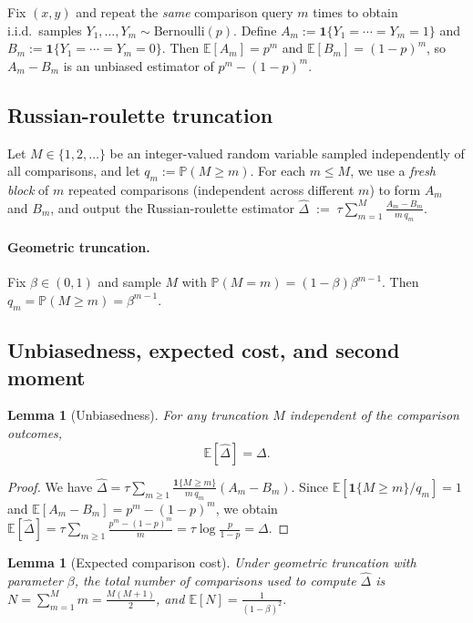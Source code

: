 \documentclass[11pt]{article}
\theoremstyle{plain}
\newtheorem{lemma}[theorem]{Lemma}
\theoremstyle{remark}
\newcommand{\E}{\mathbb{E}}
\newcommand{\Prob}{\mathbb{P}}
\newcommand{\1}{\mathbf{1}}
\begin{document}
Fix $(x,y)$ and repeat the \emph{same} comparison query $m$ times to obtain i.i.d.\ samples
$Y_1,\dots,Y_m\sim\mathrm{Bernoulli}(p)$. Define
$
A_m:=\1\{Y_1=\cdots=Y_m=1\}$
and
$B_m:=\1\{Y_1=\cdots=Y_m=0\}.$
Then $\E[A_m]=p^m$ and $\E[B_m]=(1-p)^m$, so $A_m-B_m$ is an unbiased estimator of $p^m-(1-p)^m$.

\subsection{Russian-roulette truncation}
\label{sub_trunc}
Let $M\in\{1,2,\dots\}$ be an integer-valued random variable sampled independently of all comparisons, and let
$q_m:=\Prob(M\ge m).$
For each $m\le M$, we use a \emph{fresh block} of $m$ repeated comparisons (independent across different $m$) to form
$A_m$ and $B_m$, and output the Russian-roulette estimator
$
\widehat\Delta
\;:=\;
\tau\sum_{m=1}^{M}\frac{A_m-B_m}{m\,q_m}.
$

\paragraph{Geometric truncation.}
Fix $\beta\in(0,1)$ and sample $M$ with $\Prob(M=m)=(1-\beta)\beta^{m-1}$.
Then $q_m=\Prob(M\ge m)=\beta^{m-1}$.

\subsection{Unbiasedness, expected cost, and second moment}

\begin{propbox}
\begin{lemma}[Unbiasedness]\label{lem:unbiased}
For any truncation $M$ independent of the comparison outcomes,
\[
\E[\widehat\Delta]=\Delta.
\]
\end{lemma}
\end{propbox}

\begin{proof}
We have
$
\widehat\Delta
=
\tau\sum_{m\ge1}\frac{\1\{M\ge m\}}{m\,q_m}(A_m-B_m).
$
Since $\E[\1\{M\ge m\}/q_m]=1$ and $\E[A_m-B_m]=p^m-(1-p)^m$, we obtain
$
\E[\widehat\Delta]
=
\tau\sum_{m\ge1}\frac{p^m-(1-p)^m}{m}
=
\tau\log\frac{p}{1-p}
=
\Delta.
$
\end{proof}

\begin{propbox}
\begin{lemma}[Expected comparison cost]\label{lem:cost}
Under geometric truncation with parameter $\beta$, the total number of comparisons used to compute $\widehat\Delta$ is
$N=\sum_{m=1}^{M} m = \frac{M(M+1)}{2}$, and
$
\E[N]=\frac{1}{(1-\beta)^2}.
$
\end{lemma}
\end{propbox}
\end{document}
